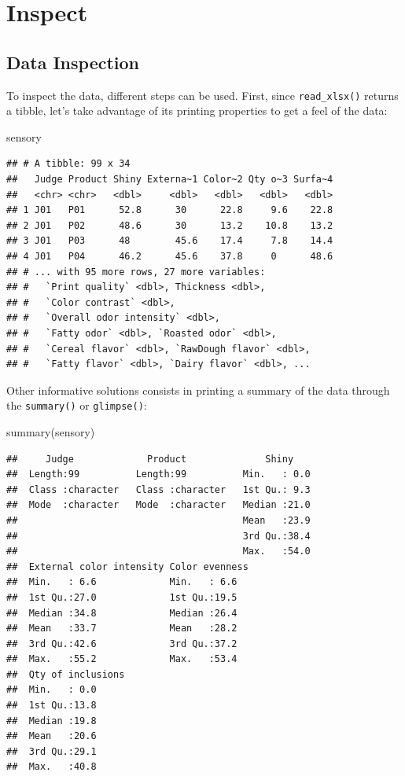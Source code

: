 \documentclass[
]{krantz}
\makeatletter
\newenvironment{Shaded}{\begin{snugshade}}{\end{snugshade}}
\newcommand{\FunctionTok}[1]{\textcolor[rgb]{0,0,0}{#1}}
\newcommand{\NormalTok}[1]{#1}
\newenvironment{kframe}{%
\medskip{}
\setlength{\fboxsep}{.8em}
 \def\at@end@of@kframe{}%
 \ifinner\ifhmode%
  \def\at@end@of@kframe{\end{minipage}}%
  \begin{minipage}{\columnwidth}%
 \fi\fi%
 \def\FrameCommand##1{\hskip\@totalleftmargin \hskip-\fboxsep
 \colorbox{shadecolor}{##1}\hskip-\fboxsep
     \hskip-\linewidth \hskip-\@totalleftmargin \hskip\columnwidth}%
 \MakeFramed {\advance\hsize-\width
   \@totalleftmargin\z@ \linewidth\hsize
   \@setminipage}}%
 {\par\unskip\endMakeFramed%
 \at@end@of@kframe}
\renewenvironment{Shaded}{\begin{kframe}}{\end{kframe}}
\makeatother
\begin{document}
\hypertarget{inspect}{%
\section{Inspect}\label{inspect}}

\hypertarget{data-inspection}{%
\subsection{Data Inspection}\label{data-inspection}}

To inspect the data, different steps can be used.
First, since \texttt{read\_xlsx()} returns a tibble, let's take advantage of its printing properties to get a feel of the data:

\begin{Shaded}
\begin{Highlighting}[]
\NormalTok{sensory}
\end{Highlighting}
\end{Shaded}

\begin{verbatim}
## # A tibble: 99 x 34
##   Judge Product Shiny Externa~1 Color~2 Qty o~3 Surfa~4
##   <chr> <chr>   <dbl>     <dbl>   <dbl>   <dbl>   <dbl>
## 1 J01   P01      52.8      30      22.8     9.6    22.8
## 2 J01   P02      48.6      30      13.2    10.8    13.2
## 3 J01   P03      48        45.6    17.4     7.8    14.4
## 4 J01   P04      46.2      45.6    37.8     0      48.6
## # ... with 95 more rows, 27 more variables:
## #   `Print quality` <dbl>, Thickness <dbl>,
## #   `Color contrast` <dbl>,
## #   `Overall odor intensity` <dbl>,
## #   `Fatty odor` <dbl>, `Roasted odor` <dbl>,
## #   `Cereal flavor` <dbl>, `RawDough flavor` <dbl>,
## #   `Fatty flavor` <dbl>, `Dairy flavor` <dbl>, ...
\end{verbatim}

Other informative solutions consists in printing a summary of the data through the \texttt{summary()} or \texttt{glimpse()}:

\begin{Shaded}
\begin{Highlighting}[]
\FunctionTok{summary}\NormalTok{(sensory)}
\end{Highlighting}
\end{Shaded}

\begin{verbatim}
##     Judge             Product              Shiny     
##  Length:99          Length:99          Min.   : 0.0  
##  Class :character   Class :character   1st Qu.: 9.3  
##  Mode  :character   Mode  :character   Median :21.0  
##                                        Mean   :23.9  
##                                        3rd Qu.:38.4  
##                                        Max.   :54.0  
##  External color intensity Color evenness
##  Min.   : 6.6             Min.   : 6.6  
##  1st Qu.:27.0             1st Qu.:19.5  
##  Median :34.8             Median :26.4  
##  Mean   :33.7             Mean   :28.2  
##  3rd Qu.:42.6             3rd Qu.:37.2  
##  Max.   :55.2             Max.   :53.4  
##  Qty of inclusions
##  Min.   : 0.0     
##  1st Qu.:13.8     
##  Median :19.8     
##  Mean   :20.6     
##  3rd Qu.:29.1     
##  Max.   :40.8
\end{verbatim}
\end{document}
